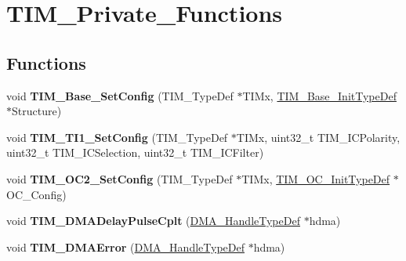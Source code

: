 \hypertarget{group___t_i_m___private___functions}{}\section{T\+I\+M\+\_\+\+Private\+\_\+\+Functions}
\label{group___t_i_m___private___functions}
\subsection*{Functions}
\begin{DoxyCompactItemize}
\item 
\mbox{\label{group___t_i_m___private___functions_ga057e4b4da135186e8fb88327c5fd0684}} 
void {\bfseries T\+I\+M\+\_\+\+Base\+\_\+\+Set\+Config} (T\+I\+M\+\_\+\+Type\+Def $\ast$T\+I\+Mx, \hyperlink{struct_t_i_m___base___init_type_def}{T\+I\+M\+\_\+\+Base\+\_\+\+Init\+Type\+Def} $\ast$Structure)
\item 
\mbox{\label{group___t_i_m___private___functions_ga83c847710a92f0558c862dd0dc889ff3}} 
void {\bfseries T\+I\+M\+\_\+\+T\+I1\+\_\+\+Set\+Config} (T\+I\+M\+\_\+\+Type\+Def $\ast$T\+I\+Mx, uint32\+\_\+t T\+I\+M\+\_\+\+I\+C\+Polarity, uint32\+\_\+t T\+I\+M\+\_\+\+I\+C\+Selection, uint32\+\_\+t T\+I\+M\+\_\+\+I\+C\+Filter)
\item 
\mbox{\label{group___t_i_m___private___functions_ga20370137a5c000fa4739d30669e67b8c}} 
void {\bfseries T\+I\+M\+\_\+\+O\+C2\+\_\+\+Set\+Config} (T\+I\+M\+\_\+\+Type\+Def $\ast$T\+I\+Mx, \hyperlink{struct_t_i_m___o_c___init_type_def}{T\+I\+M\+\_\+\+O\+C\+\_\+\+Init\+Type\+Def} $\ast$O\+C\+\_\+\+Config)
\item 
\mbox{\label{group___t_i_m___private___functions_ga78edd2f05a873d68690d8658aa427ccf}} 
void {\bfseries T\+I\+M\+\_\+\+D\+M\+A\+Delay\+Pulse\+Cplt} (\hyperlink{group___d_m_a___exported___types_ga92b907d56a9c29b93d46782a7a04f91e}{D\+M\+A\+\_\+\+Handle\+Type\+Def} $\ast$hdma)
\item 
\mbox{\label{group___t_i_m___private___functions_gaa112bee5279feee040c1ea9e283f7378}} 
void {\bfseries T\+I\+M\+\_\+\+D\+M\+A\+Error} (\hyperlink{group___d_m_a___exported___types_ga92b907d56a9c29b93d46782a7a04f91e}{D\+M\+A\+\_\+\+Handle\+Type\+Def} $\ast$hdma)

\end{DoxyCompactItemize}
